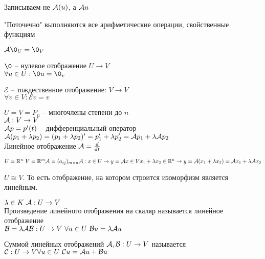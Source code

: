 \documentclass[../spring.tex]{subfiles}
\begin{document}
	\begin{remark}\hfill
		\begin{mylist}
			\item Записываем не $\mathcal{A}(u)$, а $\mathcal{A} u$
			\item "Поточечно" выполняются все арифметические операции, свойственные функциям
			\item $\A\0_U = \0_V$
		\end{mylist}
	\end{remark}
	\begin{examples}\hfill
		\begin{mylist}
			\item $\0$ -- нулевое отображение $U \rightarrow V$\\
			$\forall u \in U: \0u = \0_v$
			\item $\mathcal{E}$ -- тождественное отображение: $V \rightarrow V$\\
			$\forall v \in V: \mathcal{E}v = v$ 
			\item $U = V = P_n$ -- многочлены степени до $n$
			\\$\mathcal{A}: V \rightarrow V$\\
			$\mathcal{A} p = p'(t)$ -- дифференциальный оператор\\
			$\mathcal{A}(p_1 + \lambda p_2) = (p_1 + \lambda p_2)' = p_1' + \lambda p_2' = \mathcal{A} p_1 + \lambda \mathcal{A} p_2$\\
			Линейное отображение 
			$\mathcal{A} = \frac{d}{dt}$
			\item $U = \mathbb R^n \ V = \mathbb R^m\\
			\mathcal{A} = (a_{i j})_{m\times n}\\
			\mathcal{A}: x\in U \rightarrow y = \mathcal{A} x \in V\\
			x_1 + \lambda x_2 \in \mathbb R^n \rightarrow y = \mathcal{A}(x_1 + \lambda x_2) = \mathcal{A} x_1 + \lambda \mathcal{A} x_2$
			\item $U \cong V$. То есть отображение, на котором строится изоморфизм является линейным.
		\end{mylist}
	\end{examples}
	\begin{defin}$\lambda \in K \ \mathcal{A}: U\rightarrow V$\\
		Произведение линейного отображения на скаляр называется линейное отображение \\
		$\mathcal{B} = \lambda \mathcal{A} \\
		\mathcal{B}: U \rightarrow V \ \forall u \in U \ \mathcal{B} u = \lambda \mathcal{A} u$
	\end{defin}
	\begin{defin}
		Суммой линейных отображений $\mathcal{A}, \mathcal{B}: U \rightarrow V$ называется $\mathcal{C}: U \rightarrow V\\
		\forall u \in U \ \mathcal{C}u = \mathcal{A} u + \mathcal{B} u$
	\end{defin}
	
\end{document}
